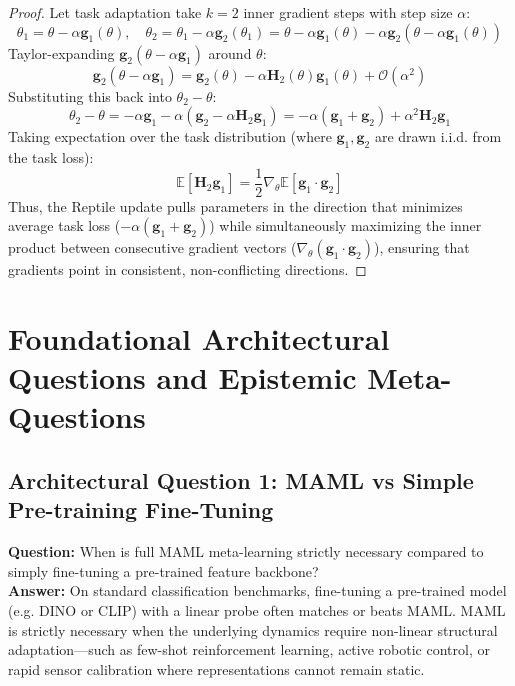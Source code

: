 \documentclass[11pt,a4paper]{article}
\theoremstyle{definition}
\begin{document}
\begin{proof}
Let task adaptation take $k = 2$ inner gradient steps with step size $\alpha$:
{\boldmath
\begin{equation}
\theta_1 = \theta - \alpha \mathbf{g}_1(\theta), \quad \theta_2 = \theta_1 - \alpha \mathbf{g}_2(\theta_1) = \theta - \alpha \mathbf{g}_1(\theta) - \alpha \mathbf{g}_2(\theta - \alpha \mathbf{g}_1(\theta))
\end{equation}
}
Taylor-expanding $\mathbf{g}_2(\theta - \alpha \mathbf{g}_1)$ around $\theta$:
{\boldmath
\begin{equation}
\mathbf{g}_2(\theta - \alpha \mathbf{g}_1) = \mathbf{g}_2(\theta) - \alpha \mathbf{H}_2(\theta) \mathbf{g}_1(\theta) + \mathcal{O}(\alpha^2)
\end{equation}
}
Substituting this back into $\theta_2 - \theta$:
{\boldmath
\begin{equation}
\theta_2 - \theta = -\alpha \mathbf{g}_1 - \alpha \left( \mathbf{g}_2 - \alpha \mathbf{H}_2 \mathbf{g}_1 \right) = -\alpha(\mathbf{g}_1 + \mathbf{g}_2) + \alpha^2 \mathbf{H}_2 \mathbf{g}_1
\end{equation}
}
Taking expectation over the task distribution (where $\mathbf{g}_1, \mathbf{g}_2$ are drawn i.i.d. from the task loss):
{\boldmath
\begin{equation}
\mathbb{E}[\mathbf{H}_2 \mathbf{g}_1] = \frac{1}{2} \nabla_\theta \mathbb{E}\left[ \mathbf{g}_1 \cdot \mathbf{g}_2 \right]
\end{equation}
}
Thus, the Reptile update pulls parameters in the direction that minimizes average task loss ($-\alpha(\mathbf{g}_1 + \mathbf{g}_2)$) while simultaneously maximizing the inner product between consecutive gradient vectors ($\nabla_\theta (\mathbf{g}_1 \cdot \mathbf{g}_2)$), ensuring that gradients point in consistent, non-conflicting directions.
\end{proof}

\section{Foundational Architectural Questions and Epistemic Meta-Questions}

\subsection{Architectural Question 1: MAML vs Simple Pre-training Fine-Tuning}
\textbf{Question:} When is full MAML meta-learning strictly necessary compared to simply fine-tuning a pre-trained feature backbone?\\
\textbf{Answer:} On standard classification benchmarks, fine-tuning a pre-trained model (e.g. DINO or CLIP) with a linear probe often matches or beats MAML. MAML is strictly necessary when the underlying dynamics require non-linear structural adaptation—such as few-shot reinforcement learning, active robotic control, or rapid sensor calibration where representations cannot remain static.
\end{document}
